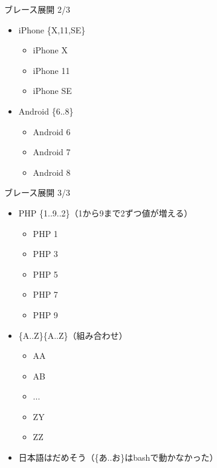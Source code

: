 \documentclass[12pt,aspectratio=169]{beamer}
\begin{document}
\begin{frame}{ブレース展開 2/3}

  \begin{itemize}
    \item iPhone \{X,11,SE\}
      \begin{itemize}
        \item iPhone X
        \item iPhone 11
        \item iPhone SE
      \end{itemize}

    \item Android \{6..8\}
      \begin{itemize}
        \item Android 6
        \item Android 7
        \item Android 8
      \end{itemize}

  \end{itemize}

\end{frame}


\begin{frame}{ブレース展開 3/3}

  \begin{itemize}
    \item PHP \{1..9..2\}（1から9まで2ずつ値が増える）
      \begin{itemize}
        \item PHP 1
        \item PHP 3
        \item PHP 5
        \item PHP 7
        \item PHP 9
      \end{itemize}

    \item \{A..Z\}\{A..Z\}（組み合わせ）
      \begin{itemize}
        \item AA
        \item AB
        \item ...
        \item ZY
        \item ZZ
      \end{itemize}
    \item 日本語はだめそう（\{あ..お\}はbashで動かなかった）

  \end{itemize}

\end{frame}
\end{document}
